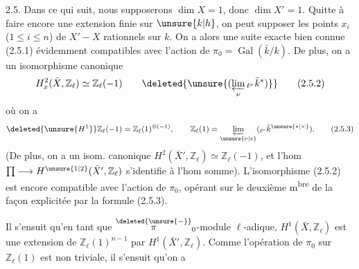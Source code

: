 2.5. Dans ce qui suit, nous supposerons $\dim X=1$, donc $\dim X'=1$. Quitte à faire encore une extension finie sur $\unsure{k|h}$, on peut supposer les points $x_i$ ($1\leq i\leq n$) de $X'-X$ rationnels sur $k$. On a alors une suite exacte bien connue
\noindent (2.5.1)
  évidemment compatibles avec l'action de   $\pi_0=\operatorname{Gal}(\bar k/k)$. De plus, on a un isomorphisme canonique
\[
H_x^2(\bar X,\mathbb Z_\ell)\simeq\mathbb Z_\ell(-1)\qquad \deleted{\unsure{(\varprojlim_\nu{}_{\ell^\nu}\bar k^*)}}\tag*{(2.5.2)}
\]
où on a
\[
\deleted{\unsure{H^1}}\mathbb Z_\ell(-1)=\mathbb Z_\ell(1)^{\otimes(-1)},\qquad \mathbb Z_\ell(1)=\varprojlim_{\unsure{\nu|v}}({}_{\ell^\nu}\bar k^{\unsure{*|\times}}).\tag*{(2.5.3)}
\]
(De plus, on a un isom. canonique $H^2(\bar X',\mathbb Z_\ell)\simeq\mathbb Z_\ell(-1)$, et l'hom $\prod\longrightarrow H^{\unsure{1|2}}(\bar X',\mathbb Z_\ell)$ s'identifie à l'hom somme). L'isomorphisme (2.5.2) est encore compatible avec l'action de $\pi_0$, opérant sur le deuxième m\textsuperscript{bre} de la façon explicitée par la formule (2.5.3). 

Il s'ensuit qu'en tant que $\overset{\deleted{\unsure{-}}}{\pi}_0$-module $\ell$-adique, $H^1(\bar X,\mathbb Z_\ell)$ est une extension de $\mathbb Z_\ell(1)^{n-1}$ par $H^1(\bar X',\mathbb Z_\ell)$. Comme l'opération de $\pi_0$ sur $\mathbb Z_\ell(1)$ est non triviale, il s'ensuit  qu'on a
